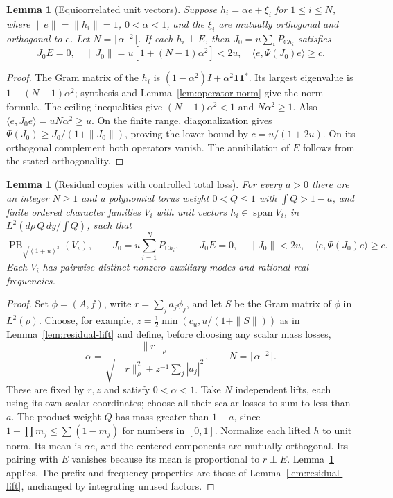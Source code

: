 \documentclass[reqno,a4paper,12pt]{amsart}
\newtheorem{lemma}[theorem]{Lemma}
\theoremstyle{definition}
\newcommand{\C}{\mathbb C}
\newcommand{\ip}[2]{\langle #1,#2\rangle}
\newcommand{\spn}{\operatorname{span}}
\newcommand{\PB}{\operatorname{PB}}
\begin{document}
\begin{lemma}[Equicorrelated unit vectors]\label{lem:equicorrelated}
Suppose $h_i=\alpha e+\xi_i$ for $1\le i\le N$, where
$\|e\|=\|h_i\|=1$, $0<\alpha<1$, and the $\xi_i$ are mutually
orthogonal and orthogonal to $e$. Let $N=\lceil\alpha^{-2}\rceil$.
If each $h_i\perp E$, then
$J_0=u\sum_iP_{\C h_i}$ satisfies
\[
 J_0E=0,\quad \|J_0\|=u[1+(N-1)\alpha^2]<2u,\quad
 \ip{e}{\Psi(J_0)e}\ge c.
\]
\end{lemma}
\begin{proof}
The Gram matrix of the $h_i$ is
$(1-\alpha^2)I+\alpha^2\mathbf1\mathbf1^*$.
Its largest eigenvalue is $1+(N-1)\alpha^2$; synthesis and
Lemma~\ref{lem:operator-norm} give the norm formula.
The ceiling inequalities give $(N-1)\alpha^2<1$ and $N\alpha^2\ge1$.
Also $\ip{e}{J_0e}=uN\alpha^2\ge u$.
On the finite range, diagonalization gives
$\Psi(J_0)\ge J_0/(1+\|J_0\|)$, proving the lower bound by
$c=u/(1+2u)$. On its orthogonal complement both operators vanish.
The annihilation of $E$ follows from the stated orthogonality.
\end{proof}

\begin{lemma}[Residual copies with controlled total loss]
\label{lem:residual-copies}
For every $a>0$ there are an integer $N\ge1$ and a polynomial torus
weight $0<Q\le1$ with
$\int Q>1-a$, and finite ordered character families $V_i$ with unit
vectors $h_i\in\spn V_i$, in
$L^2(d\rho\,Q\,dy/\int Q)$, such that
\[
 \PB_{\sqrt{(1+u)^3}}(V_i),\qquad
 J_0=u\sum_{i=1}^NP_{\C h_i},\qquad
 J_0E=0,\quad\|J_0\|<2u,\quad\ip{e}{\Psi(J_0)e}\ge c.
\]
Each $V_i$ has pairwise distinct nonzero auxiliary modes and rational
real frequencies.
\end{lemma}
\begin{proof}
Set $\phi=(A,f)$, write $r=\sum_j a_j\phi_j$, and let $S$ be the
Gram matrix of $\phi$ in $L^2(\rho)$. Choose, for example,
$z=\frac12\min(c_u,u/(1+\|S\|))$ as in
Lemma~\ref{lem:residual-lift} and define, before
choosing any scalar mass losses,
\[
 \alpha=\frac{\|r\|_\rho}
 {\sqrt{\|r\|_\rho^2+z^{-1}\sum_j|a_j|^2}},\qquad
 N=\lceil\alpha^{-2}\rceil.
\]
These are fixed by $r,z$ and satisfy $0<\alpha<1$.
Take $N$ independent lifts, each using its own scalar coordinates;
choose all their scalar losses to sum to less than $a$.
The product weight $Q$ has mass greater than $1-a$, since
$1-\prod m_j\le\sum(1-m_j)$ for numbers in $[0,1]$.
Normalize each lifted $h$ to unit norm. Its mean is $\alpha e$,
and the centered components are mutually orthogonal.
Its pairing with $E$ vanishes because its mean is proportional to
$r\perp E$. Lemma~\ref{lem:equicorrelated} applies.
The prefix and frequency properties are those of
Lemma~\ref{lem:residual-lift}, unchanged by integrating unused factors.
\end{proof}
\end{document}
